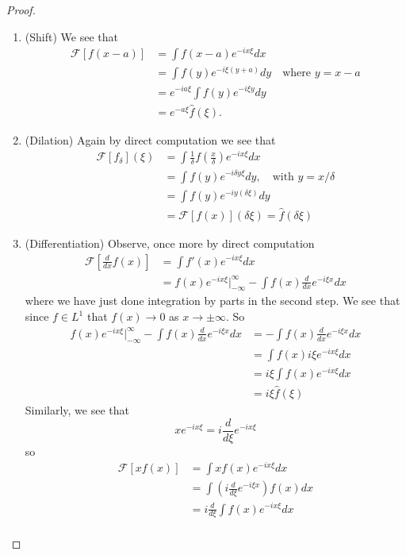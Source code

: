 \begin{proof}
\begin{enumerate}
\item{(Shift)} We see that
\begin{align*}
\mathcal{F}[f(x-a)] &= \int f(x-a)e^{-ix\xi}dx \\
&= \int f(y)e^{-i\xi(y+a)}dy\quad\text{where }y=x-a\\
&= e^{-ia\xi}\int f(y)e^{-i\xi y}dy\\
&= e^{-a\xi}\widehat{f}(\xi).
\end{align*}
\item{(Dilation)} Again by direct computation we see that
\begin{align*}
\mathcal{F}[f_{\delta}](\xi) &= \int \frac{1}{\delta}f\left(\frac{x}{\delta}\right)e^{-ix\xi}dx\\
&=\int f(y)e^{-i\delta y\xi}dy,\quad\text{with }y=x/\delta\\
&=\int f(y)e^{-iy(\delta\xi)}dy\\
&=\mathcal{F}[f(x)](\delta\xi) = \widehat{f}(\delta\xi)
\end{align*}
\item{(Differentiation)} Observe, once more by direct
  computation
\begin{align*}
\mathcal{F}\left[\frac{d}{dx}f(x)\right] &= \int
f'(x)e^{-ix\xi}dx\\
&=f(x)e^{-ix\xi}|^{\infty}_{-\infty} - \int
f(x)\frac{d}{dx}e^{-i\xi x}dx 
\end{align*}
where we have just done integration by parts in the second
step. We see that since $f\in L^1$ that $f(x)\to 0$ as
$x\to\pm\infty$. So
\begin{align*}
f(x)e^{-ix\xi}|^{\infty}_{-\infty} - \int
f(x)\frac{d}{dx}e^{-i\xi x}dx  &= -\int
f(x)\frac{d}{dx}e^{-i\xi x}dx\\
&= \int f(x)i\xi e^{-ix\xi}dx\\
&= i\xi \int f(x)e^{-ix\xi}dx\\
&= i\xi \widehat{f}(\xi)
\end{align*}
Similarly, we see that 
\begin{equation}
xe^{-ix\xi} = i\frac{d}{d\xi}e^{-ix\xi}
\end{equation}
so
\begin{align*}
\mathcal{F}[xf(x)] &= \int xf(x)e^{-ix\xi}dx\\
&= \int \left(i\frac{d}{d\xi}e^{-i\xi x}\right)f(x)dx\\
&= i\frac{d}{d\xi}\int f(x)e^{-ix\xi}dx\\

\end{align*}
\end{enumerate}
\end{proof}
